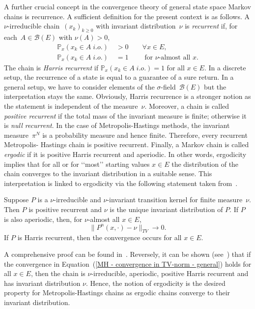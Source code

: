 A further crucial concept in the convergence theory of general state space Markov chains is recurrence. A sufficient definition for the present context is as follows. A $\nu$-irreducible chain~$(x_k)_{k \geq 0} $ with invariant distribution~$\nu$ is \textit{recurrent} if, for each~$A \in \mathcal{B}(E) $ with $\nu(A) > 0 $, 
\begin{align}
 \mathbb{P}_x (x_k \in A \; i.o. ) & \; > 0 \qquad \forall x \in E, \\
 \mathbb{P}_x (x_k \in A \; i.o.) & \; = 1 \qquad \text{ for $\nu$-almost all } x.
\end{align}
The chain is \textit{Harris recurrent} if $ \mathbb{P}_x(x_k \in A \; i.o.) = 1 $ for all $x \in E$. In a discrete setup, the recurrence of a state is equal to a guarantee of a sure return. In a general setup, we have to consider elements of the $\sigma$-field~$\mathcal{B}(E)$ but the interpretation stays the same. Obviously, Harris recurrence is a stronger notion as the statement is independent of the measure~$\nu$. Moreover, a chain is called \textit{positive recurrent} if the total mass of the invariant measure is finite; otherwise it is \textit{null recurrent}. In the case of Metropolis-Hastings methods, the invariant measure~$\pi^{N}$ is a probability measure and hence finite. Therefore, every recurrent Metropolis- Hastings chain is positive recurrent. Finally, a Markov chain is called \textit{ergodic} if it is positive Harris recurrent and aperiodic. In other words, ergodicity implies that for all or for ‘‘most’’ starting values $x \in E$ the distribution of the chain converges to the invariant distribution in a suitable sense. This interpretation is linked to ergodicity via the following statement taken from~\autocite{Tierny1994}.

\begin{thm}\autocite[Theorem 1]{Tierny1994}
\label{Theorem - convergence}
 Suppose $P$ is a $\nu$-irreducible and $\nu$-invariant transition kernel for finite measure~$\nu$. Then $P$ is positive recurrent and $\nu$ is the unique invariant distribution of $P$. If $P$ is also aperiodic, then, for $\nu$-almost all $x \in E$,
 \begin{equation}
 \label{MH - convergence in TV-norm - general}
  \| P^n (x, \cdot) - \nu \|_{TV} \to 0.
 \end{equation}
 If $P$ is Harris recurrent, then the convergence occurs for all $x \in E$.

\end{thm}

A comprehensive proof can be found in~\autocite{Athreya1996}. Reversely, it can be shown (see~\autocite{Tierny1994}) that if the convergence in Equation~(\ref{MH - convergence in TV-norm - general}) holds for all $x \in E$, then the chain is $\nu$-irreducible, aperiodic, positive Harris recurrent and has invariant distribution $\nu$. Hence, the notion of ergodicity is the desired property for Metropolis-Hastings chains as ergodic chains converge to their invariant distribution.
\newline

